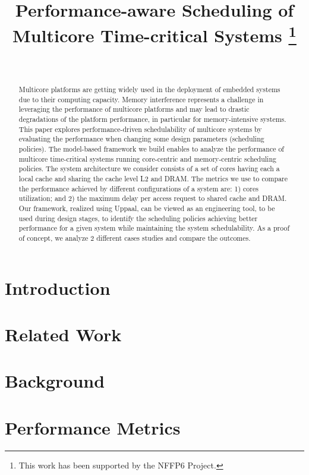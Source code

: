 \documentclass{IEEEtran}
\title{Performance-aware Scheduling of Multicore Time-critical Systems \thanks{This work has been supported by the NFFP6 Project.}}
\author{
\IEEEauthorblockN{Jalil Boudjadar, Jin Hyun Kim, Simin Nadjm-Tehrani} \\
\IEEEauthorblockA{Department of Computer and Information Science \\ Link\"oping University, Sweden} 
}
\begin{document}
\maketitle


\begin{abstract}
Multicore platforms are getting widely used in the deployment of embedded systems due to their computing capacity. Memory interference represents a challenge in leveraging the performance of multicore platforms and may lead to drastic degradations of the platform performance, in particular for memory-intensive systems. This paper explores performance-driven schedulability of  multicore systems by evaluating the performance when changing some design parameters (scheduling policies). The model-based framework we build enables to analyze the performance of multicore time-critical systems running core-centric and memory-centric scheduling policies. The system architecture we consider consists of a set of cores having each a local cache and sharing the cache level L2 and DRAM. The metrics we use to compare the performance achieved by different configurations of a system are: 1) cores utilization; and 2) the maximum delay per access request to shared cache and DRAM. Our framework, realized using Uppaal, can be viewed as an engineering tool, to be used during design stages, to identify the scheduling policies achieving  better performance for a given system while maintaining the system schedulability. As a proof of concept, we analyze 2 different cases studies and compare the outcomes.
\end{abstract}



\section{Introduction}


\section{Related Work}



\section{Background}


\section{Performance Metrics}

\end{document}
